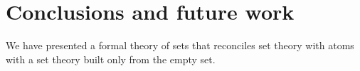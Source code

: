 \section{Conclusions and future work}

We have presented a formal theory of sets that reconciles set theory with atoms with a set theory built only from the empty set.




